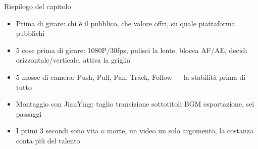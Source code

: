 \begin{tcbsummary}{Riepilogo del capitolo}
\begin{itemize}
  \item Prima di girare: chi è il pubblico, che valore offri, su quale piattaforma pubblichi
  \item 5 cose prima di girare: 1080P/30fps, pulisci la lente, blocca AF/AE, decidi orizzontale/verticale, attiva la griglia
  \item 5 mosse di camera: Push, Pull, Pan, Track, Follow — la stabilità prima di tutto
  \item Montaggio con JianYing: taglio transizione sottotitoli BGM esportazione, sei passaggi
  \item I primi 3 secondi sono vita o morte, un video un solo argomento, la costanza conta più del talento
\end{itemize}

\end{tcbsummary}
